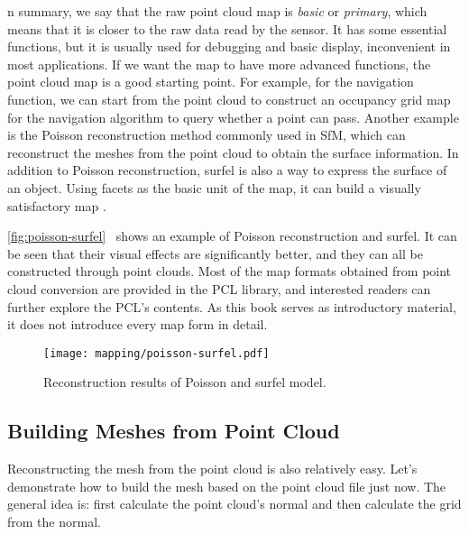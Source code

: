 n summary, we say that the raw point cloud map is \textit{basic} or \textit{primary}, which means that it is closer to the raw data read by the sensor. It has some essential functions, but it is usually used for debugging and basic display, inconvenient in most applications. If we want the map to have more advanced functions, the point cloud map is a good starting point. For example, for the navigation function, we can start from the point cloud to construct an occupancy grid map for the navigation algorithm to query whether a point can pass. Another example is the Poisson reconstruction {\cite{Kazhdan2006}} method commonly used in SfM, which can reconstruct the meshes from the point cloud to obtain the surface information. In addition to Poisson reconstruction, surfel is also a way to express the surface of an object. Using facets as the basic unit of the map, it can build a visually satisfactory map {\cite{Stuckler2014}}.

\autoref{fig:poisson-surfel}~ shows an example of Poisson reconstruction and surfel. It can be seen that their visual effects are significantly better, and they can all be constructed through point clouds. Most of the map formats obtained from point cloud conversion are provided in the PCL library, and interested readers can further explore the PCL's contents. As this book serves as introductory material, it does not introduce every map form in detail.

\begin{figure}[!htp]
	\centering
	\texttt{[image: mapping/poisson-surfel.pdf]}
	\caption{Reconstruction results of Poisson and surfel model. }
	\label{fig:poisson-surfel}
\end{figure}

\subsection{Building Meshes from Point Cloud}
Reconstructing the mesh from the point cloud is also relatively easy. Let's demonstrate how to build the mesh based on the point cloud file just now. The general idea is: first calculate the point cloud's normal and then calculate the grid from the normal.


